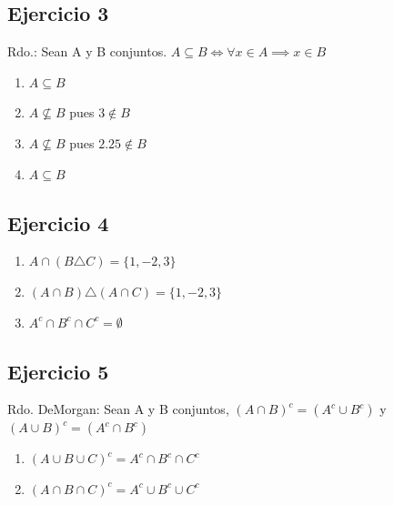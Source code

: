 \subsection{Ejercicio 3}
Rdo.: Sean A y B conjuntos. $ A \subseteq B \iff \forall x \in A \implies x \in B$
\begin{enumerate}[label=(\alph*)]
    \item $A \subseteq B$
    \item $A \not \subseteq B$ pues $3 \not \in B$
    \item $A \not \subseteq B$ pues $2.25 \not \in B$
    \item $A \subseteq B$
\end{enumerate}

\subsection{Ejercicio 4}
\begin{enumerate}[label=(\alph*)]
    \item $A \cap (B \triangle C) = \{ 1,-2,3 \}$
    \item $(A \cap B) \triangle (A \cap C) = \{1,-2,3\}$
    \item $A^c \cap B^c \cap C^c = \emptyset$ 
\end{enumerate}

\subsection{Ejercicio 5}
Rdo. DeMorgan: Sean A y B conjuntos, $(A \cap B)^c = (A^c \cup B^c)$ y $(A \cup B)^c = (A^c \cap B^c)$

\begin{enumerate}
    \item $(A \cup B \cup C)^c = A^c \cap B^c \cap C^c$
    \item $(A \cap B \cap C)^c = A^c \cup B^c \cup C^c$
\end{enumerate}

